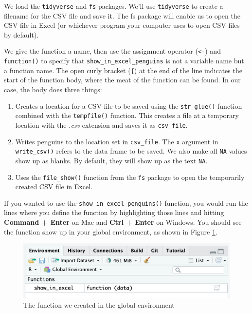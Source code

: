\documentclass[
]{book}
\begin{document}
We load the \texttt{tidyverse} and \texttt{fs} packages. We'll use \texttt{tidyverse} to create a filename for the CSV file and save it. The fs package will enable us to open the CSV file in Excel (or whichever program your computer uses to open CSV files by default).

We give the function a name, then use the assignment operator (\texttt{\textless{}-}) and \texttt{function()} to specify that \texttt{show\_in\_excel\_penguins} is not a variable name but a function name. The open curly bracket (\texttt{\{}) at the end of the line indicates the start of the function body, where the meat of the function can be found. In our case, the body does three things:

\begin{enumerate}
\def\labelenumi{\arabic{enumi}.}
\item
  Creates a location for a CSV file to be saved using the \texttt{str\_glue()} function combined with the \texttt{tempfile()} function. This creates a file at a temporary location with the \emph{.csv} extension and saves it as \texttt{csv\_file}.
\item
  Writes penguins to the location set in \texttt{csv\_file}. The \texttt{x} argument in \texttt{write\_csv()} refers to the data frame to be saved. We also make all \texttt{NA} values show up as blanks. By default, they will show up as the text \texttt{NA}.
\item
  Uses the \texttt{file\_show()} function from the \texttt{fs} package to open the temporarily created CSV file in Excel.
\end{enumerate}

If you wanted to use the \texttt{show\_in\_excel\_penguins()} function, you would run the lines where you define the function by highlighting those lines and hitting \textbf{Command + Enter} on Mac and \textbf{Ctrl + Enter} on Windows. You should see the function show up in your global environment, as shown in Figure \ref{fig:function-in-global-environment}.

\begin{figure}
\includegraphics[width=1\linewidth]{assets/function-in-global-environment} \caption{The function we created in the global environment}\label{fig:function-in-global-environment}
\end{figure}
\end{document}
